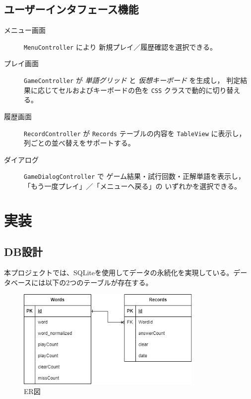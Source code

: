 \documentclass[a4j]{ujarticle}
\begin{document}
\subsection{ユーザーインタフェース機能}
\begin{description}
  \item[メニュー画面]%
    \texttt{MenuController} により
    新規プレイ／履歴確認を選択できる。
  \item[プレイ画面]%
    \texttt{GameController} が
    \emph{単語グリッド} と \emph{仮想キーボード} を生成し，
    判定結果に応じてセルおよびキーボードの色を
    \texttt{CSS} クラスで動的に切り替える。
  \item[履歴画面]%
    \texttt{RecordController} が
    \texttt{Records} テーブルの内容を
    \texttt{TableView} に表示し，
    列ごとの並べ替えをサポートする。
  \item[ダイアログ]%
    \texttt{GameDialogController} で
    ゲーム結果・試行回数・正解単語を表示し，
    「もう一度プレイ」／「メニューへ戻る」の
    いずれかを選択できる。
\end{description}

\section{実装}
\subsection{DB設計}
本プロジェクトでは、SQLiteを使用してデータの永続化を実現している。データベースには以下の2つのテーブルが存在する。

\begin{figure}[h]
\centering
\includegraphics[width=0.8\textwidth]{er.png}
\caption{ER図}
\label{fig:er}
\end{figure}
\end{document}
